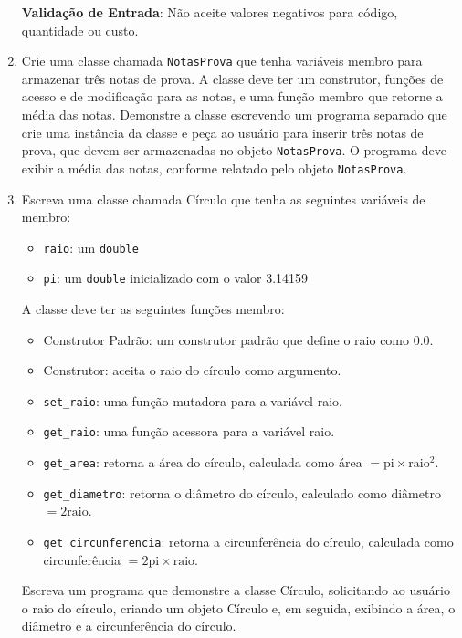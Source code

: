 \documentclass[12pt]{article}
\begin{document}
\begin{enumerate}
    \textbf{Validação de Entrada}: Não aceite valores negativos para código, quantidade ou custo.

  \item Crie uma classe chamada \texttt{NotasProva} que tenha variáveis membro para armazenar três notas de prova. A classe deve ter um construtor, funções de acesso e de modificação para as notas, e uma função membro que retorne a média das notas. Demonstre a classe escrevendo um programa separado que crie uma instância da classe e peça ao usuário para inserir três notas de prova, que devem ser armazenadas no objeto \texttt{NotasProva}. O programa deve exibir a média das notas, conforme relatado pelo objeto \texttt{NotasProva}.

  \item Escreva uma classe chamada Círculo que tenha as seguintes variáveis de membro:
    \begin{itemize}
      \item \texttt{raio}: um \texttt{double}
      \item \texttt{pi}: um \texttt{double} inicializado com o valor 3.14159
    \end{itemize}
    A classe deve ter as seguintes funções membro:
    \begin{itemize}
      \item Construtor Padrão: um construtor padrão que define o raio como 0.0.
      \item Construtor: aceita o raio do círculo como argumento.
      \item \texttt{set\_raio}: uma função mutadora para a variável raio.
      \item \texttt{get\_raio}: uma função acessora para a variável raio.
      \item \texttt{get\_area}: retorna a área do círculo, calculada como área $= \text{pi} \times \text{raio}^2$.
      \item \texttt{get\_diametro}: retorna o diâmetro do círculo, calculado como diâmetro $= 2\text{raio}$.
      \item \texttt{get\_circunferencia}: retorna a circunferência do círculo, calculada como circunferência $= 2\text{pi} \times \text{raio}$.
    \end{itemize}
    Escreva um programa que demonstre a classe Círculo, solicitando ao usuário o raio do círculo, criando um objeto Círculo e, em seguida, exibindo a área, o diâmetro e a circunferência do círculo.


\end{enumerate}
\end{document}
